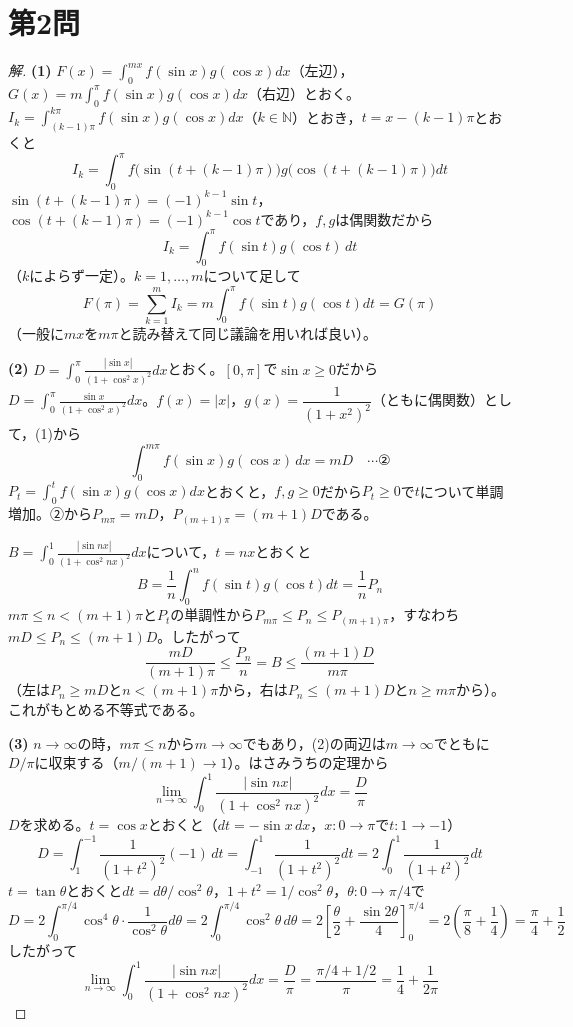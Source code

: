 \documentclass[../main.tex]{subfiles}
\begin{document}
\newpage

\section*{第2問}

\begin{proof}[解]
  \textbf{(1)} $F(x)=\displaystyle\int_0^{mx}f(\sin x)g(\cos x)dx$（左辺），$G(x)=m\displaystyle\int_0^\pi f(\sin x)g(\cos x)dx$（右辺）とおく。$I_k=\displaystyle\int_{(k-1)\pi}^{k\pi}f(\sin x)g(\cos x)dx$（$k\in\mathbb N$）とおき，$t=x-(k-1)\pi$とおくと
  \[
    I_k=\int_0^\pi f\bigl(\sin(t+(k-1)\pi)\bigr)g\bigl(\cos(t+(k-1)\pi)\bigr)dt
  \]
  $\sin(t+(k-1)\pi)=(-1)^{k-1}\sin t$，$\cos(t+(k-1)\pi)=(-1)^{k-1}\cos t$であり，$f,g$は偶関数だから
  \[
    I_k=\int_0^\pi f(\sin t)g(\cos t)\,dt
  \]
  （$k$によらず一定）。$k=1,\dots,m$について足して
  \[
    F(\pi)=\sum_{k=1}^mI_k=m\int_0^\pi f(\sin t)g(\cos t)dt=G(\pi)
  \]
  （一般に$mx$を$m\pi$と読み替えて同じ議論を用いれば良い）。

  \textbf{(2)} $D=\displaystyle\int_0^\pi\frac{|\sin x|}{(1+\cos^2x)^2}dx$とおく。$[0,\pi]$で$\sin x\ge0$だから$D=\displaystyle\int_0^\pi\frac{\sin x}{(1+\cos^2x)^2}dx$。$f(x)=|x|$，$g(x)=\dfrac1{(1+x^2)^2}$（ともに偶関数）として，(1)から
  \[
    \int_0^{m\pi}f(\sin x)g(\cos x)\,dx=mD \quad\cdots\text{②}
  \]
  $P_t=\displaystyle\int_0^tf(\sin x)g(\cos x)dx$とおくと，$f,g\ge0$だから$P_t\ge0$で$t$について単調増加。②から$P_{m\pi}=mD$，$P_{(m+1)\pi}=(m+1)D$である。

  $B=\displaystyle\int_0^1\frac{|\sin nx|}{(1+\cos^2nx)^2}dx$について，$t=nx$とおくと
  \[
    B=\frac1n\int_0^nf(\sin t)g(\cos t)dt=\frac1nP_n
  \]
  $m\pi\le n<(m+1)\pi$と$P_t$の単調性から$P_{m\pi}\le P_n\le P_{(m+1)\pi}$，すなわち$mD\le P_n\le(m+1)D$。したがって
  \[
    \frac{mD}{(m+1)\pi}\le\frac{P_n}n=B\le\frac{(m+1)D}{m\pi}
  \]
  （左は$P_n\ge mD$と$n<(m+1)\pi$から，右は$P_n\le(m+1)D$と$n\ge m\pi$から）。これがもとめる不等式である。

  \textbf{(3)} $n\to\infty$の時，$m\pi\le n$から$m\to\infty$でもあり，(2)の両辺は$m\to\infty$でともに$D/\pi$に収束する（$m/(m+1)\to1$）。はさみうちの定理から
  \[
    \lim_{n\to\infty}\int_0^1\frac{|\sin nx|}{(1+\cos^2nx)^2}dx=\frac{D}\pi
  \]
  $D$を求める。$t=\cos x$とおくと（$dt=-\sin x\,dx$，$x:0\to\pi$で$t:1\to-1$）
  \[
    D=\int_1^{-1}\frac1{(1+t^2)^2}(-1)\,dt=\int_{-1}^1\frac1{(1+t^2)^2}dt=2\int_0^1\frac1{(1+t^2)^2}dt
  \]
  $t=\tan\theta$とおくと$dt=d\theta/\cos^2\theta$，$1+t^2=1/\cos^2\theta$，$\theta:0\to\pi/4$で
  \[
    D=2\int_0^{\pi/4}\cos^4\theta\cdot\frac1{\cos^2\theta}d\theta=2\int_0^{\pi/4}\cos^2\theta\,d\theta=2\left[\frac\theta2+\frac{\sin2\theta}4\right]_0^{\pi/4}=2\left(\frac\pi8+\frac14\right)=\frac\pi4+\frac12
  \]
  したがって
  \[
    \lim_{n\to\infty}\int_0^1\frac{|\sin nx|}{(1+\cos^2nx)^2}dx=\frac D\pi=\frac{\pi/4+1/2}\pi=\frac14+\frac1{2\pi}
  \]
\end{proof}
\end{document}
